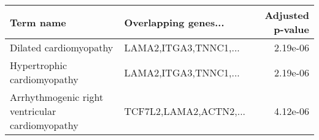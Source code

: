 \begin{tabular}{llr}
\toprule
                                      Term name &   Overlapping genes... &  Adjusted p-value \\
\midrule
                         Dilated cardiomyopathy &  LAMA2,ITGA3,TNNC1,... &          2.19e-06 \\
                    Hypertrophic cardiomyopathy &  LAMA2,ITGA3,TNNC1,... &          2.19e-06 \\
Arrhythmogenic right ventricular cardiomyopathy & TCF7L2,LAMA2,ACTN2,... &          4.12e-06 \\
\bottomrule
\end{tabular}

